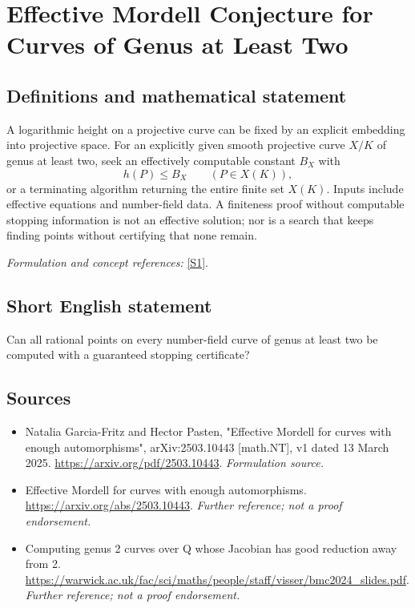 \documentclass[11pt]{article}
\begin{document}
\section*{\texorpdfstring{Effective Mordell Conjecture for Curves of Genus at Least Two}{Effective Mordell Conjecture for Curves of Genus at Least Two}}\label{97}
\subsection{Definitions and mathematical statement}
A logarithmic height on a projective curve can be fixed by an explicit embedding into projective space. For an explicitly given smooth projective curve $X/K$ of genus at least two, seek an effectively computable constant $B_X$ with
\[
 h(P)\le B_X\qquad(P\in X(K)),
\]
or a terminating algorithm returning the entire finite set $X(K)$. Inputs include effective equations and number-field data. A finiteness proof without computable stopping information is not an effective solution; nor is a search that keeps finding points without certifying that none remain.
\par\smallskip\textit{Formulation and concept references:} \href{https://arxiv.org/pdf/2503.10443}{[S1]}.

\subsection{Short English statement}
Can all rational points on every number-field curve of genus at least two be computed with a guaranteed stopping certificate?
\subsection{Sources}
\begin{itemize}
\item[S1]Natalia Garcia-Fritz and Hector Pasten, "Effective Mordell for curves with enough automorphisms", arXiv:2503.10443 [math.NT], v1 dated 13 March 2025.
\url{https://arxiv.org/pdf/2503.10443}.
\textit{Formulation source.}
\item[S2]Effective Mordell for curves with enough automorphisms.
\url{https://arxiv.org/abs/2503.10443}.
\textit{Further reference; not a proof endorsement.}
\item[S3]Computing genus 2 curves over Q whose Jacobian has good reduction away from 2.
\url{https://warwick.ac.uk/fac/sci/maths/people/staff/visser/bmc2024_slides.pdf}.
\textit{Further reference; not a proof endorsement.}
\end{itemize}
\end{document}

